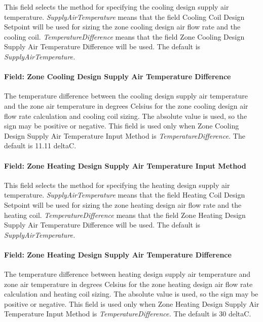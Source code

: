 This field selects the method for specifying the cooling design supply air temperature. \emph{SupplyAirTemperature} means that the field Cooling Coil Design Setpoint will be used for sizing the zone cooling design air flow rate and the cooling coil. \emph{TemperatureDifference} means that the field Zone Cooling Design Supply Air Temperature Difference will be used. The default is \emph{SupplyAirTemperature.}

\paragraph{Field: Zone Cooling Design Supply Air Temperature Difference}\label{field-zone-cooling-design-supply-air-temperature-difference-000}

The temperature difference between the cooling design supply air temperature and the zone air temperature in degrees Celsius for the zone cooling design air flow rate calculation and cooling coil sizing. The absolute value is used, so the sign may be positive or negative. This field is used only when Zone Cooling Design Supply Air Temperature Input Method is \emph{TemperatureDifference.} The default is 11.11 deltaC.

\paragraph{Field: Zone Heating Design Supply Air Temperature Input Method}\label{field-zone-heating-design-supply-air-temperature-input-method-000}

This field selects the method for specifying the heating design supply air temperature. \emph{SupplyAirTemperature} means that the field Heating Coil Design Setpoint will be used for sizing the zone heating design air flow rate and the heating coil. \emph{TemperatureDifference} means that the field Zone Heating Design Supply Air Temperature Difference will be used. The default is \emph{SupplyAirTemperature.}

\paragraph{Field: Zone Heating Design Supply Air Temperature Difference}\label{field-zone-heating-design-supply-air-temperature-difference-000}

The temperature difference between heating design supply air temperature and zone air temperature in degrees Celsius for the zone heating design air flow rate calculation and heating coil sizing. The absolute value is used, so the sign may be positive or negative. This field is used only when Zone Heating Design Supply Air Temperature Input Method is \emph{TemperatureDifference.} The default is 30 deltaC.

